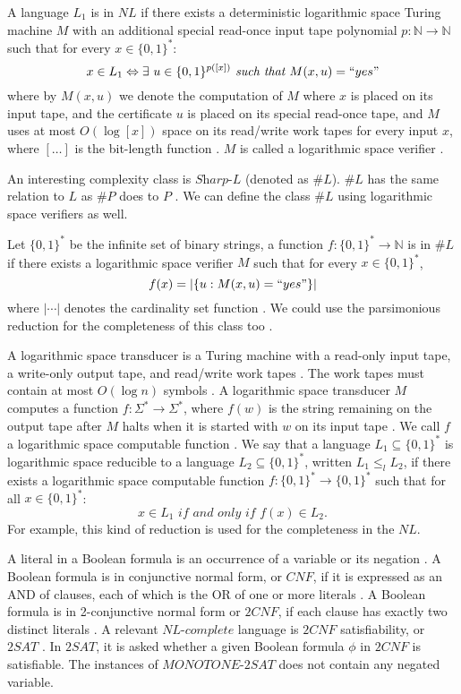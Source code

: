 \documentclass[a4paper,UKenglish,cleveref, autoref]{lipics-v2019}
\begin{document}
A language $L_{1}$ is in $NL$ if there exists a deterministic logarithmic space Turing machine $M$ with an additional special read-once input tape polynomial $p: \mathbb{N} \rightarrow \mathbb{N}$ such that for every $x \in \{0, 1\}^{*}$:
\[x \in L_{1} \Leftrightarrow \exists \ u \in \{0, 1\}^{p([x])} \textit{ such that } M(x, u) = ``yes" \]
where by $M(x, u)$ we denote the computation of $M$ where $x$ is placed on its input tape, and the certificate $u$ is placed on its special read-once tape, and $M$ uses at most $O(\log [x])$ space on its read/write work tapes for every input $x$, where $[\ldots]$ is the bit-length function \cite{AB09}. $M$ is called a logarithmic space verifier \cite{AB09}.

An interesting complexity class is $\textit{Sharp-L}$ (denoted as $\#L$). $\#L$ has the same relation to $L$ as $\#P$ does to $P$ \cite{AJ93}. We can define the class $\#L$ using logarithmic space verifiers as well.

Let $\{0, 1\}^{*}$ be the infinite set of binary strings, a function $f : \{0, 1\}^{*} \rightarrow \mathbb{N}$ is in $\#L$ if there exists a logarithmic space verifier $M$ such that for every $x \in \{0, 1\}^{*}$,
\[f(x) = |\{u : M(x, u) = ``yes"\}|\]
where $|\cdots|$ denotes the cardinality set function \cite{AJ93}. We could use the parsimonious reduction for the completeness of this class too \cite{AB09}.

A logarithmic space transducer is a Turing machine with a read-only input tape, a write-only output tape, and read/write work tapes \cite{MS06}. The work tapes must contain at most $O(\log n)$ symbols \cite{MS06}. A logarithmic space transducer $M$ computes a function $f : \Sigma^{*} \rightarrow \Sigma^{*}$, where $f(w)$ is the string remaining on the output tape after $M$ halts when it is started with $w$ on its input tape \cite{MS06}. We call $f$ a logarithmic space computable function \cite{MS06}. We say that a language $L_{1} \subseteq \{0, 1\}^{*}$ is logarithmic space reducible to a language $L_{2} \subseteq \{0, 1\}^{*}$, written $L_{1} \leq_{l} L_{2}$, if there exists a logarithmic space computable function $f : \{0, 1\}^{*} \rightarrow \{0, 1\}^{*}$ such that for all $x \in \{0, 1\}^{*}$:
\[x \in L_{1} \textit{ if and only if } f(x) \in L_{2}.\]
For example, this kind of reduction is used for the completeness in the $NL$.

A literal in a Boolean formula is an occurrence of a variable or its negation \cite{CLRS01}. A Boolean formula is in conjunctive normal form, or $CNF$, if it is expressed as an AND of clauses, each of which is the OR of one or more literals \cite{CLRS01}. A Boolean formula is in 2-conjunctive normal form or $2CNF$, if each clause has exactly two distinct literals \cite{Pap03}. A relevant $\textit{NL-complete}$ language is $2CNF$ satisfiability, or $2SAT$ \cite{Pap03}. In $2SAT$, it is asked whether a given Boolean formula $\phi$ in $2CNF$ is satisfiable. The instances of $\textit{MONOTONE-2SAT}$ does not contain any negated variable.
\end{document}
